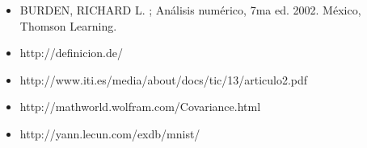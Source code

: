 \documentclass[10pt, a4paper]{article}
\begin{document}
\begin{itemize}

\item BURDEN, RICHARD L. ; An\'alisis num\'erico, 7ma ed. 2002. M\'exico, Thomson Learning.

\item http://definicion.de/
\item http://www.iti.es/media/about/docs/tic/13/articulo2.pdf
\item http://mathworld.wolfram.com/Covariance.html
\item http://yann.lecun.com/exdb/mnist/

\end{itemize}
\end{document}
